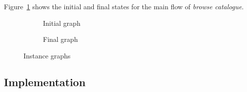 \begin{example} Figure~\ref{fig:tests:graphs} shows the initial and final states for the main flow of \emph{browse catalogue}.

\begin{figure}[!ht]
  \centering
  \begin{subfigure}[t]{.5\textwidth}
    \centerline{}
    \caption{Initial graph}
  \end{subfigure}%
  \begin{subfigure}[t]{.5\textwidth}
    \centerline{}
    \caption{Final graph}
  \end{subfigure}
  \caption{Instance graphs}\label{fig:tests:graphs}
\end{figure}
\end{example}

\subsection{Implementation} 

